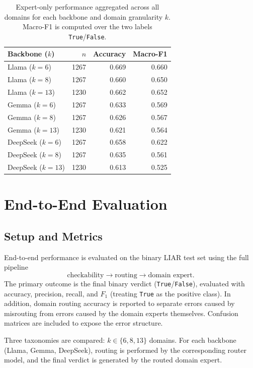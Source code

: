 \begin{table}[t]
\centering
\caption{Expert-only performance aggregated across all domains for each backbone and domain granularity $k$.
Macro-F1 is computed over the two labels \texttt{True}/\texttt{False}.}
\label{tab:expert_overall_summary}
\small
\begin{tabular}{lrrr}
\toprule
Backbone ($k$) & $n$ & Accuracy & Macro-F1 \\
\midrule
Llama ($k{=}6$)  & 1267 & 0.669 & 0.660 \\
Llama ($k{=}8$)  & 1267 & 0.660 & 0.650 \\
Llama ($k{=}13$) & 1230 & 0.662 & 0.652 \\
\midrule
Gemma ($k{=}6$)  & 1267 & 0.633 & 0.569 \\
Gemma ($k{=}8$)  & 1267 & 0.626 & 0.567 \\
Gemma ($k{=}13$) & 1230 & 0.621 & 0.564 \\
\midrule
DeepSeek ($k{=}6$)  & 1267 & 0.658 & 0.622 \\
DeepSeek ($k{=}8$)  & 1267 & 0.635 & 0.561 \\
DeepSeek ($k{=}13$) & 1230 & 0.613 & 0.525 \\
\bottomrule
\end{tabular}
\normalsize
\end{table}

\section{End-to-End Evaluation}

\subsection{Setup and Metrics}
End-to-end performance is evaluated on the binary LIAR test set using the full pipeline
\[
\text{checkability} \rightarrow \text{routing} \rightarrow \text{domain expert}.
\]
The primary outcome is the final binary verdict (\texttt{True}/\texttt{False}), evaluated with
accuracy, precision, recall, and $F_1$ (treating \texttt{True} as the positive class). In addition,
domain routing accuracy is reported to separate errors caused by misrouting from errors caused by
the domain experts themselves. Confusion matrices are included to expose the error structure.

Three taxonomies are compared: $k \in \{6,8,13\}$ domains. For each backbone (Llama, Gemma,
DeepSeek), routing is performed by the corresponding router model, and the final verdict is
generated by the routed domain expert.

